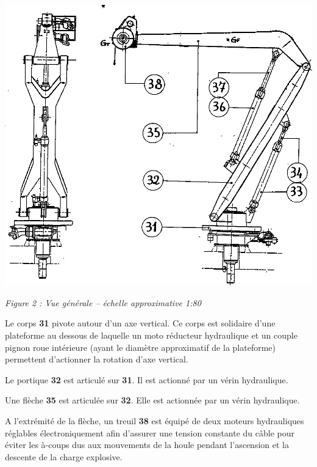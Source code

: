 \documentclass[10pt]{article}
\begin{document}
\begin{minipage}[c]{.6\linewidth}
\begin{center}
\includegraphics[width=.95\textwidth]{images/Grue_02}

\textit{Figure 2 : Vue générale -- échelle approximative 1:80}
\end{center}
\end{minipage} \hfill
\begin{minipage}[c]{.38\linewidth}

Le corps \textbf{31} pivote autour d'un axe vertical. Ce corps est solidaire d'une plateforme au dessous de laquelle un moto réducteur hydraulique et un couple pignon roue intérieure (ayant le diamètre approximatif de la plateforme) permettent d'actionner la rotation d'axe vertical.

Le portique \textbf{32}  est articulé sur \textbf{31}. Il est actionné par un vérin hydraulique. 

Une flèche \textbf{35} est articulée sur \textbf{32}. Elle est actionnée par un vérin hydraulique. 
\end{minipage}

\vspace{.25cm}

A l'extrémité de la flèche, un treuil \textbf{38} est équipé de deux moteurs hydrauliques réglables électroniquement afin d'assurer une tension constante du câble pour éviter les à-coups dus aux mouvements de la houle pendant l'ascension et la descente de la charge explosive. 
\end{document}
